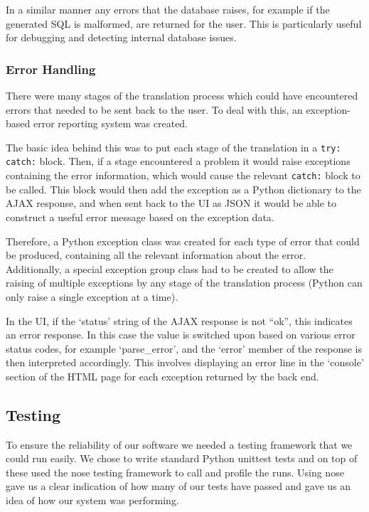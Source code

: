 \documentclass[a4paper, 11pt]{article}
\begin{document}
      In a similar manner any errors that the database raises, for example if
      the generated SQL is malformed, are returned for the user. This is
      particularly useful for debugging and detecting internal database
      issues.

    \subsubsection{Error Handling}
      There were many stages of the translation process which could have
      encountered errors that needed to be sent back to the user. To deal with
      this, an exception-based error reporting system was created.

      The basic idea behind this was to put each stage of the translation in a
      \texttt{try: catch:} block. Then, if a stage encountered a problem it
      would raise exceptions containing the error information, which would cause
      the relevant \texttt{catch:} block to be called. This block would then add
      the exception as a Python dictionary to the AJAX response, and when sent
      back to the UI as JSON it would be able to construct a useful error
      message based on the exception data.

      Therefore, a Python exception class was created for each type of error
      that could be produced, containing all the relevant information about the
      error. Additionally, a special exception group class had to be created to
      allow the raising of multiple exceptions by any stage of the translation
      process (Python can only raise a single exception at a time).

      In the UI, if the `status' string of the AJAX response is not ``ok'', this
      indicates an error response. In this case the value is switched upon based
      on various error status codes, for example `parse\_error', and the `error'
      member of the response is then interpreted accordingly. This involves
      displaying an error line in the `console' section of the HTML page for
      each exception returned by the back end.

  \subsection{Testing}
  To ensure the reliability of our software we needed a testing framework that
  we could run easily. We chose to write standard Python unittest tests and on
  top of these used the nose testing framework to call and profile the runs.
  Using nose gave us a clear indication of how many of our tests have passed
  and gave us an idea of how our system was performing.
\end{document}
